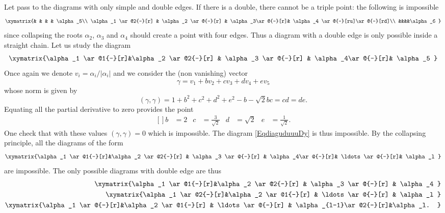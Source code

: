 Let pass to the diagrams with only simple and double edges. If there is a double, there cannot be a triple point: the following is impossible
\begin{equation}
    \xymatrix{%
         &                          &           &               &       \alpha_5\\
        \alpha_1 \ar@2{-}[r]   &    \alpha_2 \ar@{-}[r] & \alpha_3\ar@{-}[r]&  \alpha_4 \ar@{-}[ru]\ar@{-}[rd]\\
        &&&&\alpha_6
       }
\end{equation}
since collapsing the roots \( \alpha_2\), \( \alpha_3\) and \( \alpha_4\) should create a point with four edges. Thus a diagram with a double edge is only possible inside a straight chain. Let us study the diagram
\begin{equation}        \label{EqdiaguduuuDy}
    \xymatrix{%
    \alpha_1 \ar@1{-}[r]&\alpha_2  \ar@2{-}[r]   &    \alpha_3 \ar@{-}[r] & \alpha_4\ar@{-}[r]&  \alpha_5
       }
\end{equation}
Once again we denote \( v_i=\alpha_i/| \alpha_i |\) and we consider the (non vanishing) vector
\begin{equation}
    \gamma=v_1+bv_2+cv_3+dv_4+ev_5
\end{equation}
whose norm is given by
\begin{equation}
    (\gamma,\gamma)=1+b^2+c^2+d^2+e^2-b-\sqrt{2}bc=cd=de.
\end{equation}
Equating all the partial derivative to zero provides the point 
\begin{equation}
    \begin{aligned}[]
        b&=2&c&=\frac{ 3 }{ \sqrt{2} }&d&=\sqrt{2}&e&=\frac{1}{ \sqrt{2} }.
    \end{aligned}
\end{equation}
One check that with these values \( (\gamma,\gamma)=0\) which is impossible. The diagram \eqref{EqdiaguduuuDy} is thus impossible. By the collapsing principle, all the diagrams of the form
\begin{equation}
    \xymatrix{%
    \alpha_1 \ar@1{-}[r]&\alpha_2  \ar@2{-}[r]   &    \alpha_3 \ar@{-}[r] & \alpha_4\ar@{-}[r]& \ldots \ar@{-}[r]&  \alpha_l
       }
\end{equation}
are impossible. The only possible diagrams with double edge are thus
\begin{subequations}
    \begin{align}
    \xymatrix{%
    \alpha_1 \ar@1{-}[r]&\alpha_2  \ar@2{-}[r]   &    \alpha_3 \ar@{-}[r] & \alpha_4
       }\\
    \xymatrix{%
    \alpha_1 \ar@2{-}[r]&\alpha_2  \ar@1{-}[r]   & \ldots \ar@{-}[r] & \alpha_l
    }    \label{subEqDynkdspds}\\
    \xymatrix{%
    \alpha_1 \ar@{-}[r]&\alpha_2  \ar@1{-}[r]   & \ldots \ar@{-}[r] & \alpha_{l-1}\ar@2{-}[r]&\alpha_l.
    }    \label{subEqdunksspd}
    \end{align}
\end{subequations}
